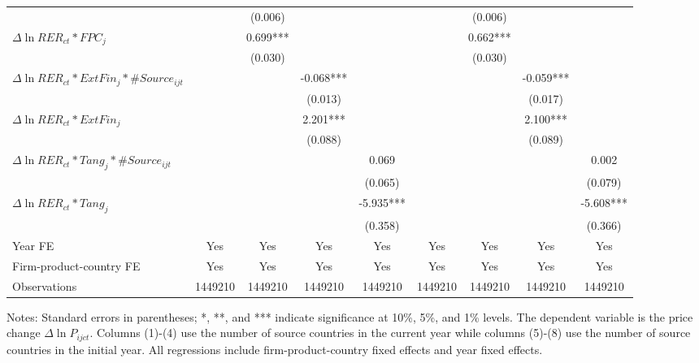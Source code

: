 \documentclass[12pt]{article}
\begin{document}
\begin{table}
{\begin{threeparttable}
\begin{tabular}{lcccccccc}
			&       & (0.006) &       &  &       & (0.006) &       &\\
			$\Delta \ln RER_{ct}*FPC_{j}$ &       & 0.699*** &       &  &       & 0.662*** &       &\\
			&       & (0.030) &       & &       & (0.030) &       & \\
			$\Delta \ln RER_{ct}*ExtFin_{j}*\#Source_{ijt}$ &       &    &   -0.068*** &  &       &    &   -0.059*** &\\
			&       &       & (0.013) &  &       &       & (0.017) &\\
			$\Delta \ln RER_{ct}*ExtFin_{j}$ &       &       & 2.201*** &   &       &       & 2.100*** &\\
			&       &       & (0.088) &  &       &       & (0.089) &\\
			$\Delta \ln RER_{ct}*Tang_{j}*\#Source_{ijt}$ &       &       &       & 0.069 &       &       &       & 0.002\\
			&       &       &       & (0.065) &       &       &       & (0.079)\\
			$\Delta \ln RER_{ct}*Tang_{j}$ &       &       &       & -5.935*** &       &       &       & -5.608***\\
			&       &       &       & (0.358) &       &       &       & (0.366)\\
			Year FE  & Yes   & Yes   & Yes   & Yes & Yes   & Yes   & Yes   & Yes\\
			Firm-product-country FE & Yes   & Yes   & Yes   & Yes & Yes   & Yes   & Yes   & Yes\\
			Observations & 1449210 & 1449210 & 1449210 & 1449210 & 1449210 & 1449210 & 1449210 & 1449210\\
			\bottomrule
		\end{tabular}
		\begin{tablenotes}
			\footnotesize
			\item[Notes:] Standard errors in parentheses; *, **, and *** indicate significance at 10\%, 5\%, and 1\% levels. The dependent variable is the price change $\Delta \ln P_{ijct}$. Columns (1)-(4) use the number of source countries in the current year while columns (5)-(8) use the number of source countries in the initial year. All regressions include firm-product-country fixed effects and year fixed effects.
		\end{tablenotes}
	\end{threeparttable}
	}
	\label{tab.source}
\end{table}
\end{document}
